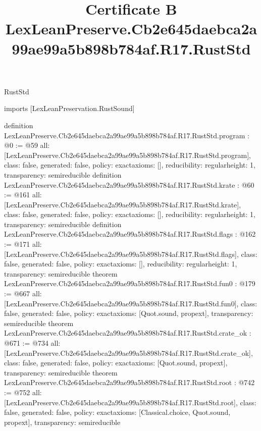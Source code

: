 \begin{lexlean}{RustStd}
\title{Certificate B LexLeanPreserve.Cb2e645daebca2a99ae99a5b898b784af.R17.RustStd}
\begin{coremodule}
imports [LexLeanPreservation.RustSound]

definition LexLeanPreserve.Cb2e645daebca2a99ae99a5b898b784af.R17.RustStd.program : @0 := @59 {
  all: [LexLeanPreserve.Cb2e645daebca2a99ae99a5b898b784af.R17.RustStd.program],
  class: false,
  generated: false,
  policy: exact{axioms: []},
  reducibility: regular{height: 1},
  transparency: semireducible
}
definition LexLeanPreserve.Cb2e645daebca2a99ae99a5b898b784af.R17.RustStd.krate : @60 := @161 {
  all: [LexLeanPreserve.Cb2e645daebca2a99ae99a5b898b784af.R17.RustStd.krate],
  class: false,
  generated: false,
  policy: exact{axioms: []},
  reducibility: regular{height: 1},
  transparency: semireducible
}
definition LexLeanPreserve.Cb2e645daebca2a99ae99a5b898b784af.R17.RustStd.flags : @162 := @171 {
  all: [LexLeanPreserve.Cb2e645daebca2a99ae99a5b898b784af.R17.RustStd.flags],
  class: false,
  generated: false,
  policy: exact{axioms: []},
  reducibility: regular{height: 1},
  transparency: semireducible
}
theorem LexLeanPreserve.Cb2e645daebca2a99ae99a5b898b784af.R17.RustStd.fun0 : @179 := @667 {
  all: [LexLeanPreserve.Cb2e645daebca2a99ae99a5b898b784af.R17.RustStd.fun0],
  class: false,
  generated: false,
  policy: exact{axioms: [Quot.sound, propext]},
  transparency: semireducible
}
theorem LexLeanPreserve.Cb2e645daebca2a99ae99a5b898b784af.R17.RustStd.crate_ok : @671 := @734 {
  all: [LexLeanPreserve.Cb2e645daebca2a99ae99a5b898b784af.R17.RustStd.crate_ok],
  class: false,
  generated: false,
  policy: exact{axioms: [Quot.sound, propext]},
  transparency: semireducible
}
theorem LexLeanPreserve.Cb2e645daebca2a99ae99a5b898b784af.R17.RustStd.root : @742 := @752 {
  all: [LexLeanPreserve.Cb2e645daebca2a99ae99a5b898b784af.R17.RustStd.root],
  class: false,
  generated: false,
  policy: exact{axioms: [Classical.choice, Quot.sound, propext]},
  transparency: semireducible
}


\end{coremodule}
\end{lexlean}
